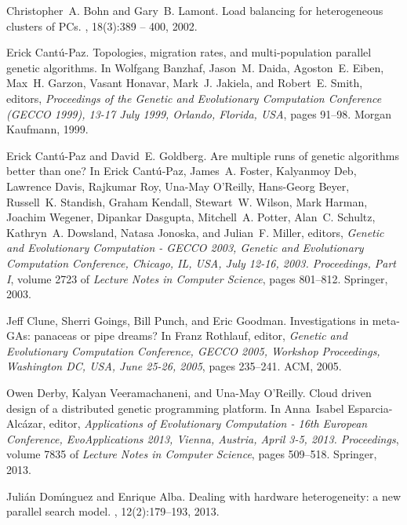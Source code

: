 \documentclass[final,1p,times]{elsarticle}
\begin{document}
\begin{thebibliography}{10}
Christopher~A. Bohn and Gary~B. Lamont.
\newblock Load balancing for heterogeneous clusters of {PCs}.
, 18(3):389 -- 400, 2002.

Erick Cant{\'{u}}{-}Paz.
\newblock Topologies, migration rates, and multi-population parallel genetic
  algorithms.
\newblock In Wolfgang Banzhaf, Jason~M. Daida, Agoston~E. Eiben, Max~H. Garzon,
  Vasant Honavar, Mark~J. Jakiela, and Robert~E. Smith, editors, {\em
  Proceedings of the Genetic and Evolutionary Computation Conference {(GECCO}
  1999), 13-17 July 1999, Orlando, Florida, {USA}}, pages 91--98. Morgan
  Kaufmann, 1999.

Erick Cant{\'{u}}{-}Paz and David~E. Goldberg.
\newblock Are multiple runs of genetic algorithms better than one?
\newblock In Erick Cant{\'{u}}{-}Paz, James~A. Foster, Kalyanmoy Deb, Lawrence
  Davis, Rajkumar Roy, Una{-}May O'Reilly, Hans{-}Georg Beyer, Russell~K.
  Standish, Graham Kendall, Stewart~W. Wilson, Mark Harman, Joachim Wegener,
  Dipankar Dasgupta, Mitchell~A. Potter, Alan~C. Schultz, Kathryn~A. Dowsland,
  Natasa Jonoska, and Julian~F. Miller, editors, {\em Genetic and Evolutionary
  Computation - {GECCO} 2003, Genetic and Evolutionary Computation Conference,
  Chicago, IL, USA, July 12-16, 2003. Proceedings, Part {I}}, volume 2723 of
  {\em Lecture Notes in Computer Science}, pages 801--812. Springer, 2003.

Jeff Clune, Sherri Goings, Bill Punch, and Eric Goodman.
\newblock Investigations in meta-{GAs}: panaceas or pipe dreams?
\newblock In Franz Rothlauf, editor, {\em Genetic and Evolutionary Computation
  Conference, {GECCO} 2005, Workshop Proceedings, Washington DC, USA, June
  25-26, 2005}, pages 235--241. {ACM}, 2005.

Owen Derby, Kalyan Veeramachaneni, and Una{-}May O'Reilly.
\newblock Cloud driven design of a distributed genetic programming platform.
\newblock In Anna~Isabel Esparcia{-}Alc{\'{a}}zar, editor, {\em Applications of
  Evolutionary Computation - 16th European Conference, EvoApplications 2013,
  Vienna, Austria, April 3-5, 2013. Proceedings}, volume 7835 of {\em Lecture
  Notes in Computer Science}, pages 509--518. Springer, 2013.

Juli{\'{a}}n Dom{\'{\i}}nguez and Enrique Alba.
\newblock Dealing with hardware heterogeneity: a new parallel search model.
, 12(2):179--193, 2013.


\end{thebibliography}
\end{document}
